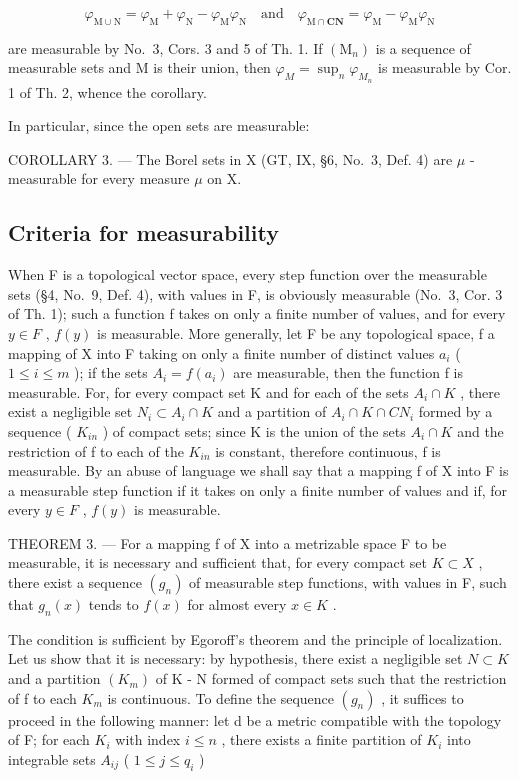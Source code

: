 \[
\varphi_ {\mathrm{M} \cup \mathrm{N}} = \varphi_ {\mathrm{M}} + \varphi_ {\mathrm{N}} - \varphi_ {\mathrm{M}} \varphi_ {\mathrm{N}} \quad \text {and} \quad \varphi_ {\mathrm{M} \cap \mathbf {C N}} = \varphi_ {\mathrm{M}} - \varphi_ {\mathrm{M}} \varphi_ {\mathrm{N}}
\]

are measurable by No.~3, Cors. 3 and 5 of Th. 1. If \((\mathrm{M}_{n})\) is a sequence of measurable sets and M is their union, then \(\varphi_{M} = \sup_{n} \varphi_{M_{n}}\) is measurable by Cor. 1 of Th. 2, whence the corollary.

In particular, since the open sets are measurable:

COROLLARY 3. --- The Borel sets in X (GT, IX, §6, No.~3, Def. 4) are \(\mu\) -measurable for every measure \(\mu\) on X.

\subsection{Criteria for measurability}

When F is a topological vector space, every step function over the measurable sets (§4, No.~9, Def. 4), with values in F, is obviously measurable (No.~3, Cor. 3 of Th. 1); such a function f takes on only a finite number of values, and for every \(y \in F\) , \(f(y)\) is measurable. More generally, let F be any topological space, f a mapping of X into F taking on only a finite number of distinct values \(a_i\) ( \(1 \leqslant i \leqslant m\) ); if the sets \(A_i = f(a_i)\) are measurable, then the function f is measurable. For, for every compact set K and for each of the sets \(A_i \cap K\) , there exist a negligible set \(N_i \subset A_i \cap K\) and a partition of \(A_i \cap K \cap C N_i\) formed by a sequence ( \(K_{in}\) ) of compact sets; since K is the union of the sets \(A_i \cap K\) and the restriction of f to each of the \(K_{in}\) is constant, therefore continuous, f is measurable. By an abuse of language we shall say that a mapping f of X into F is a measurable step function if it takes on only a finite number of values and if, for every \(y \in F\) , \(f(y)\) is measurable.

THEOREM 3. --- For a mapping f of X into a metrizable space F to be measurable, it is necessary and sufficient that, for every compact set \(K \subset X\) , there exist a sequence \((g_{n})\) of measurable step functions, with values in F, such that \(g_{n}(x)\) tends to \(f(x)\) for almost every \(x \in K\) .

The condition is sufficient by Egoroff's theorem and the principle of localization. Let us show that it is necessary: by hypothesis, there exist a negligible set \(N \subset K\) and a partition \((K_{m})\) of K - N formed of compact sets such that the restriction of f to each \(K_{m}\) is continuous. To define the sequence \((g_{n})\) , it suffices to proceed in the following manner: let d be a metric compatible with the topology of F; for each \(K_{i}\) with index \(i \leqslant n\) , there exists a finite partition of \(K_{i}\) into integrable sets \(A_{ij}\) ( \(1 \leqslant j \leqslant q_{i}\) )

